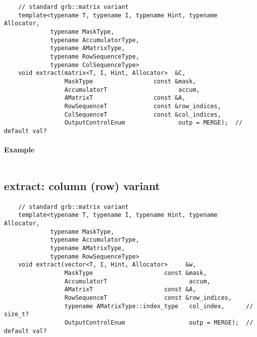 \begin{verbatim}
    // standard grb::matrix variant
    template<typename T, typename I, typename Hint, typename Allocator,
             typename MaskType,
             typename AccumulatorType,
             typename AMatrixType,
             typename RowSequenceType,
             typename ColSequenceType>
    void extract(matrix<T, I, Hint, Allocator>  &C,
                 MaskType                 const &mask,
                 AccumulatorT                    accum,
                 AMatrixT                 const &A,
                 RowSequenceT             const &row_indices,
                 ColSequenceT             const &col_indices,
                 OutputControlEnum               outp = MERGE);  // default val?
\end{verbatim}


\paragraph{Example}

\begin{verbatim}

\end{verbatim}

\subsection{{\sf extract}: column (row) variant}

\paragraph{\syntax}

\begin{verbatim}
    // standard grb::matrix variant
    template<typename T, typename I, typename Hint, typename Allocator,
             typename MaskType,
             typename AccumulatorType,
             typename AMatrixType,
             typename RowSequenceType>
    void extract(vector<T, I, Hint, Allocator>     &w,
                 MaskType                    const &mask,
                 AccumulatorT                       accum,
                 AMatrixT                    const &A,
                 RowSequenceT                const &row_indices,
                 typename AMatrixType::index_type   col_index,      // size_t?
                 OutputControlEnum                  outp = MERGE);  // default val?
\end{verbatim}


